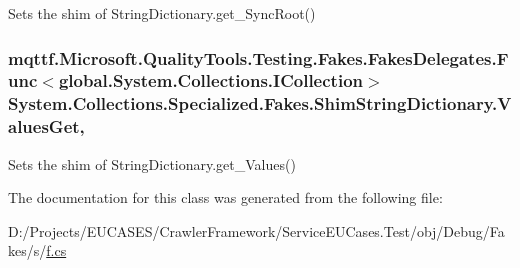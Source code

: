 Sets the shim of String\-Dictionary.\-get\-\_\-\-Sync\-Root()

\hypertarget{class_system_1_1_collections_1_1_specialized_1_1_fakes_1_1_shim_string_dictionary_a9b79fb271f697a7261685b09a6c98a08}{
\subsubsection[{Values\-Get}]{\setlength{\rightskip}{0pt plus 5cm}mqttf.\-Microsoft.\-Quality\-Tools.\-Testing.\-Fakes.\-Fakes\-Delegates.\-Func$<$global.\-System.\-Collections.\-I\-Collection$>$ System.\-Collections.\-Specialized.\-Fakes.\-Shim\-String\-Dictionary.\-Values\-Get\hspace{0.3cm}{\ttfamily [get]}, {\ttfamily [set]}}}\label{class_system_1_1_collections_1_1_specialized_1_1_fakes_1_1_shim_string_dictionary_a9b79fb271f697a7261685b09a6c98a08}


Sets the shim of String\-Dictionary.\-get\-\_\-\-Values()



The documentation for this class was generated from the following file\-:\begin{DoxyCompactItemize}
\item 
D\-:/\-Projects/\-E\-U\-C\-A\-S\-E\-S/\-Crawler\-Framework/\-Service\-E\-U\-Cases.\-Test/obj/\-Debug/\-Fakes/s/\hyperlink{s_2f_8cs}{f.\-cs}\end{DoxyCompactItemize}
